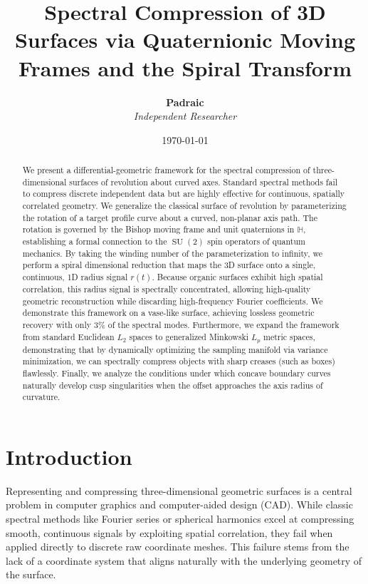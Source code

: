 \documentclass[11pt,twoside]{article}
\title{\textbf{Spectral Compression of 3D Surfaces via Quaternionic Moving Frames and the Spiral Transform}}
\author{\textbf{Padraic} \\ \textit{Independent Researcher}}
\date{\today}
\begin{document}
\maketitle

\begin{abstract}
	We present a differential-geometric framework for the spectral compression of three-dimensional surfaces of revolution about curved axes. Standard spectral methods fail to compress discrete independent data but are highly effective for continuous, spatially correlated geometry. We generalize the classical surface of revolution by parameterizing the rotation of a target profile curve about a curved, non-planar axis path. The rotation is governed by the Bishop moving frame and unit quaternions in $\mathbb{H}$, establishing a formal connection to the $\operatorname{SU}(2)$ spin operators of quantum mechanics. By taking the winding number of the parameterization to infinity, we perform a spiral dimensional reduction that maps the 3D surface onto a single, continuous, 1D radius signal $r(t)$. Because organic surfaces exhibit high spatial correlation, this radius signal is spectrally concentrated, allowing high-quality geometric reconstruction while discarding high-frequency Fourier coefficients. We demonstrate this framework on a vase-like surface, achieving lossless geometric recovery with only $3\%$ of the spectral modes. Furthermore, we expand the framework from standard Euclidean $L_2$ spaces to generalized Minkowski $L_p$ metric spaces, demonstrating that by dynamically optimizing the sampling manifold via variance minimization, we can spectrally compress objects with sharp creases (such as boxes) flawlessly. Finally, we analyze the conditions under which concave boundary curves naturally develop cusp singularities when the offset approaches the axis radius of curvature.
\end{abstract}

\section{Introduction}
Representing and compressing three-dimensional geometric surfaces is a central problem in computer graphics and computer-aided design (CAD). While classic spectral methods like Fourier series or spherical harmonics excel at compressing smooth, continuous signals by exploiting spatial correlation, they fail when applied directly to discrete raw coordinate meshes. This failure stems from the lack of a coordinate system that aligns naturally with the underlying geometry of the surface.
\end{document}
